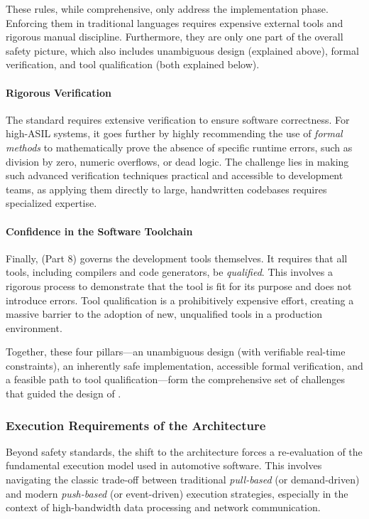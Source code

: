 These rules, while comprehensive, only address the implementation phase. Enforcing them
in traditional languages requires expensive external tools and rigorous manual discipline.
Furthermore, they are only one part of the overall safety picture, which also includes
unambiguous design (explained above), formal verification, and tool qualification (both explained
below).

\paragraph{Rigorous Verification}
The standard requires extensive verification to ensure software correctness. For high-ASIL
systems, it goes further by highly recommending the use of \emph{formal methods} to
mathematically prove the absence of specific runtime errors, such as division by zero,
numeric overflows, or dead logic. The challenge lies in making such advanced verification
techniques practical and accessible to development teams, as applying them directly to
large, handwritten codebases requires specialized expertise.

\paragraph{Confidence in the Software Toolchain}
Finally, \iso (Part 8) governs the development tools themselves. It requires that all
tools, including compilers and code generators, be \emph{qualified}. This involves a
rigorous process to demonstrate that the tool is fit for its purpose and does not
introduce errors. Tool qualification is a prohibitively expensive effort, creating a
massive barrier to the adoption of new, unqualified tools in a production environment.

Together, these four pillars---an unambiguous design (with verifiable real-time constraints), an
inherently safe implementation, accessible formal verification, and a feasible path to
tool qualification---form the comprehensive set of challenges that guided the design of
\GRust.

\subsubsection{Execution Requirements of the \sdv Architecture}
\label{sec:grust:implem:requirements:sdv}

Beyond safety standards, the shift to the \sdv architecture forces a re-evaluation of the
fundamental execution model used in automotive software. This involves navigating the classic
trade-off between traditional \emph{pull-based} (or demand-driven) and modern \emph{push-based}
(or event-driven) execution strategies, especially in the context of high-bandwidth data processing
and network communication.

